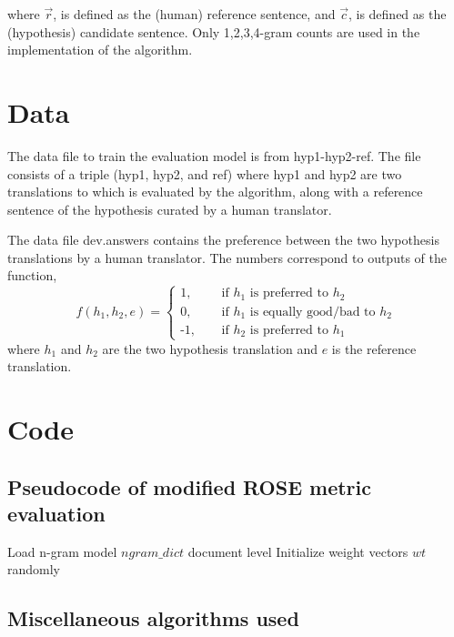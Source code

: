 \documentclass[11pt,letterpaper]{article}
\begin{document}
where $\vec{r}$, is defined as the (human) reference sentence, and $\vec{c}$, is defined as the (hypothesis) candidate sentence. Only 1,2,3,4-gram counts are used in the implementation of the algorithm.

\section{Data}

The data file to train the evaluation model is from hyp1-hyp2-ref. The file consists of a triple (hyp1, hyp2, and ref) where hyp1 and hyp2 are two translations to which is evaluated by the algorithm, along with a reference sentence of the hypothesis curated by a human translator.

The data file dev.answers contains the preference between the two hypothesis translations by a human translator. The numbers correspond to outputs of the function,
	\[ f(h_{1}, h_{2}, e) = 
		\begin{cases}
			\text{1, } &\quad\text{if $h_{1}$ is preferred to $h_{2}$}\\
			\text{0, } &\quad\text{if $h_{1}$ is equally good/bad to $h_{2}$}\\
			\text{-1, } &\quad\text{if $h_{2}$ is preferred to $h_{1}$ }
		\end{cases} \]
where $h_{1}$ and $h_{2}$ are the two hypothesis translation and $e$ is the reference translation.

\section{Code}
\subsection{Pseudocode of modified ROSE metric evaluation}
\begin{algorithm}
	Load n-gram model $ngram\_dict$ document level\;
	Initialize weight vectors $wt$ randomly\;
\end{algorithm}

\subsection{Miscellaneous algorithms used}
\end{document}
